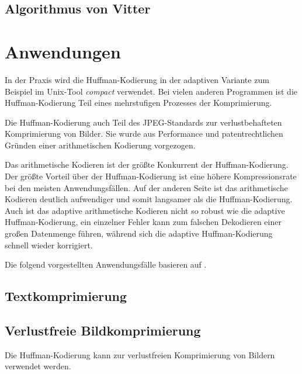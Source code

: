 \documentclass[twoside,11pt,a4paper]{article}
\theoremstyle{break}
\begin{document}

\subsection{Algorithmus von Vitter}

\section{Anwendungen}
In der Praxis wird die Huffman-Kodierung in der adaptiven Variante zum
Beispiel im Unix-Tool \emph{compact} verwendet. Bei vielen anderen
Programmen ist die Huffman-Kodierung Teil eines mehrstufigen Prozesses
der Komprimierung.

Die Huffman-Kodierung auch Teil des JPEG-Standards zur
verlustbehafteten Komprimierung von Bilder. Sie wurde aus Performance
und patentrechtlichen Gründen einer arithmetischen Kodierung
vorgezogen. \cite{Wallace:1991}

Das arithmetische Kodieren ist der größte Konkurrent der
Huffman-Kodierung. Der größte Vorteil über der Huffman-Kodierung ist
eine höhere Kompressionsrate bei den meisten Anwendungsfällen. Auf der
anderen Seite ist das arithmetische Kodieren deutlich aufwendiger und
somit langsamer als die Huffman-Kodierung. Auch ist das adaptive
arithmetische Kodieren nicht so robust wie die adaptive
Huffman-Kodierung, ein einzelner Fehler kann zum falschen Dekodieren
einer großen Datenmenge führen, während sich die adaptive
Huffman-Kodierung schnell wieder korrigiert. \cite{Bookstein:1993}






Die folgend vorgestellten Anwendungsfälle basieren auf \cite{Sayood:2006}.

\subsection{Textkomprimierung}

\subsection{Verlustfreie Bildkomprimierung}
Die Huffman-Kodierung kann zur verlustfreien Komprimierung von Bildern
verwendet werden.
\end{document}
